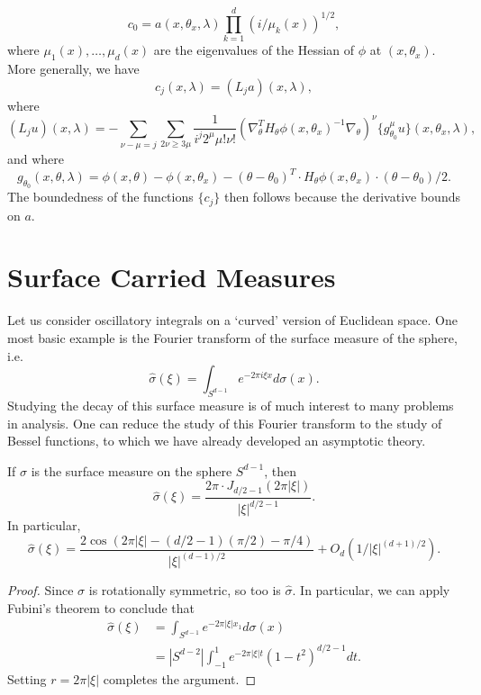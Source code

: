 %
\[ c_0 = a(x,\theta_x,\lambda) \prod_{k = 1}^d (i/\mu_k(x))^{1/2}, \]
%
where $\mu_1(x),\dots,\mu_d(x)$ are the eigenvalues of the Hessian of $\phi$ at $(x,\theta_x)$. More generally, we have
%
\[ c_j(x,\lambda) = (L_j a)(x,\lambda), \]
%
where
%
\[ (L_j u)(x,\lambda) = - \sum_{\nu - \mu = j} \sum_{2 \nu \geq 3 \mu} \frac{1}{i^j 2^\mu \mu! \nu!} (\nabla^T_\theta H_\theta \phi(x,\theta_x)^{-1} \nabla_\theta)^\nu \{ g^\mu_{\theta_0} u \} (x, \theta_x, \lambda), \]
%
and where
%
\[ g_{\theta_0}(x,\theta,\lambda) = \phi(x,\theta) - \phi(x,\theta_x) - (\theta - \theta_0)^T \cdot H_\theta \phi(x,\theta_x) \cdot (\theta - \theta_0) / 2. \]
%
The boundedness of the functions $\{ c_j \}$ then follows because the derivative bounds on $a$.






\section{Surface Carried Measures}

Let us consider oscillatory integrals on a `curved' version of Euclidean space. One most basic example is the Fourier transform of the surface measure of the sphere, i.e.
%
\[ \widehat{\sigma}(\xi) = \int_{S^{d-1}} e^{-2 \pi i \xi x} d\sigma(x). \]
%
Studying the decay of this surface measure is of much interest to many problems in analysis. One can reduce the study of this Fourier transform to the study of Bessel functions, to which we have already developed an asymptotic theory.

\begin{theorem}
  If $\sigma$ is the surface measure on the sphere $S^{d-1}$, then
  \[ \widehat{\sigma}(\xi) = \frac{2\pi \cdot J_{d/2 - 1}(2 \pi |\xi|)}{|\xi|^{d/2 - 1}}. \]
  In particular,
  \[ \widehat{\sigma}(\xi) = \frac{2 \cos(2\pi |\xi| - (d/2 - 1)(\pi/2) - \pi/4)}{|\xi|^{(d-1)/2}} + O_d(1/|\xi|^{(d+1)/2}). \]
\end{theorem}
\begin{proof}
  Since $\sigma$ is rotationally symmetric, so too is $\widehat{\sigma}$. In particular, we can apply Fubini's theorem to conclude that
  \begin{align*}
    \widehat{\sigma}(\xi) &= \int_{S^{d-1}} e^{-2 \pi |\xi| x_1} d\sigma(x)\\
    &= |S^{d-2}| \int_{-1}^1 e^{-2 \pi |\xi| t} (1 - t^2)^{d/2-1} dt.
  \end{align*}
  Setting $r = 2 \pi |\xi|$ completes the argument.
\end{proof}

